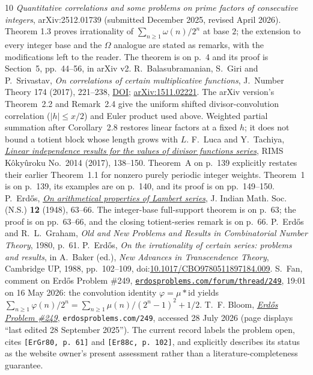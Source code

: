 \begin{thebibliography}{10}
  \emph{Quantitative correlations and some problems on prime factors of
  consecutive integers}, arXiv:2512.01739 (submitted December 2025, revised
  April 2026).  Theorem 1.3 proves irrationality of
  $\sum_{n\ge1}\omega(n)/2^n$ at base $2$; the extension to every integer base
  and the $\Omega$ analogue are stated as remarks, with the modifications left
  to the reader.  The theorem is on p.~4 and its proof is Section~5,
  pp.~44--56, in arXiv v2.
 R.~Balasubramanian, S.~Giri and P.~Srivastav,
  \emph{On correlations of certain multiplicative functions},
  J.\ Number Theory 174 (2017), 221--238,
  \href{https://doi.org/10.1016/j.jnt.2016.10.001}{DOI};
  \href{https://arxiv.org/abs/1511.02221}{arXiv:1511.02221}.
  The arXiv version's Theorem~2.2 and Remark~2.4 give the uniform shifted
  divisor-convolution correlation ($|h|\le x/2$) and Euler product used above.
  Weighted partial summation after Corollary~2.8 restores linear factors at a
  fixed $h$; it does not bound a totient block whose length grows with $L$.
 F.~Luca and Y.~Tachiya,
  \href{https://www.kurims.kyoto-u.ac.jp/~kyodo/kokyuroku/contents/pdf/2014-14.pdf}
  {\emph{Linear independence results for the values of divisor functions
  series}}, RIMS K\^oky\^uroku No.~2014 (2017), 138--150.
  Theorem~A on p.~139 explicitly restates their earlier Theorem~1.1 for
  nonzero purely periodic integer weights.  Theorem~1 is on p.~139, its
  examples are on p.~140, and its proof is on pp.~149--150.
 P.~Erd\H{o}s,
  \href{https://users.renyi.hu/~p_erdos/1948-04.pdf}
  {\emph{On arithmetical properties of Lambert series}},
  J. Indian Math. Soc. (N.S.) \textbf{12} (1948), 63--66.
  The integer-base full-support theorem is on p.~63; the proof is on
  pp.~63--66, and the closing totient-series remark is on p.~66.
 P.~Erd\H{o}s and R.~L.~Graham, \emph{Old and New
  Problems and Results in Combinatorial Number Theory}, 1980, p.~61.
 P.~Erd\H{o}s, \emph{On the irrationality of certain
  series: problems and results}, in A.~Baker (ed.), \emph{New Advances in
  Transcendence Theory}, Cambridge UP, 1988, pp.~102--109,
  doi:\href{https://doi.org/10.1017/CBO9780511897184.009}
  {10.1017/CBO9780511897184.009}.
 S.~Fan, comment on Erd\H{o}s Problem \#249,
  \href{https://www.erdosproblems.com/forum/thread/249}{\texttt{erdosproblems.com/forum/thread/249}},
  19:01 on 16 May 2026: the convolution identity $\varphi=\mu*\mathrm{id}$
  yields $\sum_{n\ge1}\varphi(n)/2^n=\sum_{n\ge1}\mu(n)/(2^n-1)^2+1/2$.
 T.~F. Bloom,
  \href{https://www.erdosproblems.com/249}{\emph{Erd\H{o}s Problem \#249}},
  \texttt{erdosproblems.com/249}, accessed 28 July 2026 (page displays
  ``last edited 28 September 2025'').  The current record labels the problem
  open, cites \texttt{[ErGr80, p.~61]} and \texttt{[Er88c, p.~102]}, and
  explicitly describes its status as the website owner's present assessment
  rather than a literature-completeness guarantee.
\end{thebibliography}
